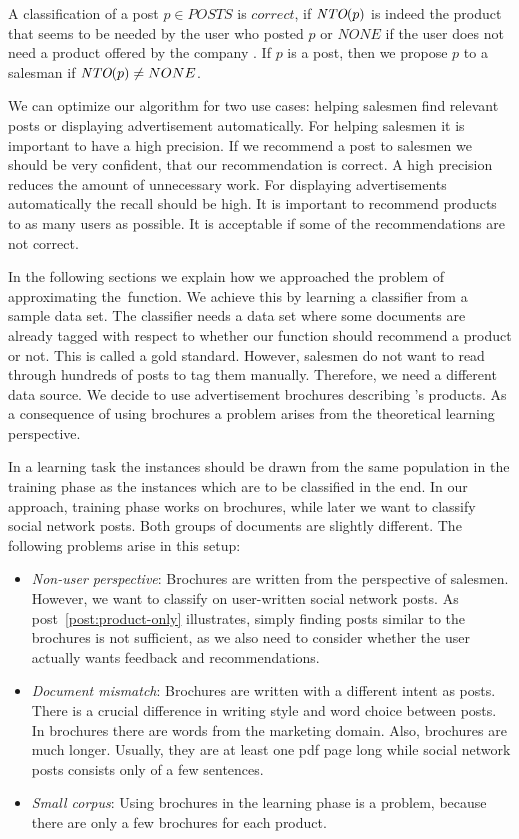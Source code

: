A classification of a post $p \in POSTS$ is $correct$, if $\emph{NTO}(p)$ is indeed the product that seems to be needed by the user who posted $p$ or $NONE$ if the user does not need a product offered by the company \acme.
If $p$ is a post, then we propose $p$ to a salesman if $\emph{NTO}(p) \neq NONE$.

We can optimize our algorithm for two use cases: helping salesmen find relevant posts or displaying advertisement automatically.
For helping salesmen it is important to have a high precision.
If we recommend a post to salesmen we should be very confident, that our recommendation is correct.
A high precision reduces the amount of unnecessary work.
For displaying advertisements automatically the recall should be high.
It is important to recommend products to as many users as possible.
It is acceptable if some of the recommendations are not correct.

In the following sections we explain how we approached the problem of approximating the~\nto function.
We achieve this by learning a classifier from a sample data set.
The classifier needs a data set where some documents are already tagged with respect to whether our \nto function should recommend a product or not.
This is called a gold standard.
However, salesmen do not want to read through hundreds of posts to tag them manually.
Therefore, we need a different data source.
We decide to use advertisement brochures describing \acme's products.
As a consequence of using brochures a problem arises from the theoretical learning perspective.

In a learning task the instances should be drawn from the same population in the training phase as the instances which are to be classified in the end.
In our approach, training phase works on brochures, while later we want to classify social network posts.
Both groups of documents are slightly different.
The following problems arise in this setup:

 \begin{itemize}
 	\item
		\emph{Non-user perspective}:
		Brochures are written from the perspective of salesmen.
		However, we want to classify on user-written social network posts.
		As post~\ref{post:product-only} illustrates, simply finding posts similar to the brochures is not sufficient, as we also need to consider whether the user actually wants feedback and recommendations.
	\item
		\emph{Document mismatch}:
		Brochures are written with a different intent as posts.
		There is a crucial difference in writing style and word choice between posts.
		In brochures there are words from the marketing domain.
		Also, brochures are much longer.
		Usually, they are at least one pdf page long while social network posts consists only of a few sentences.
	\item
		\emph{Small corpus}:
		Using brochures in the learning phase is a problem, because there are only a few brochures for each product.
 \end{itemize}

